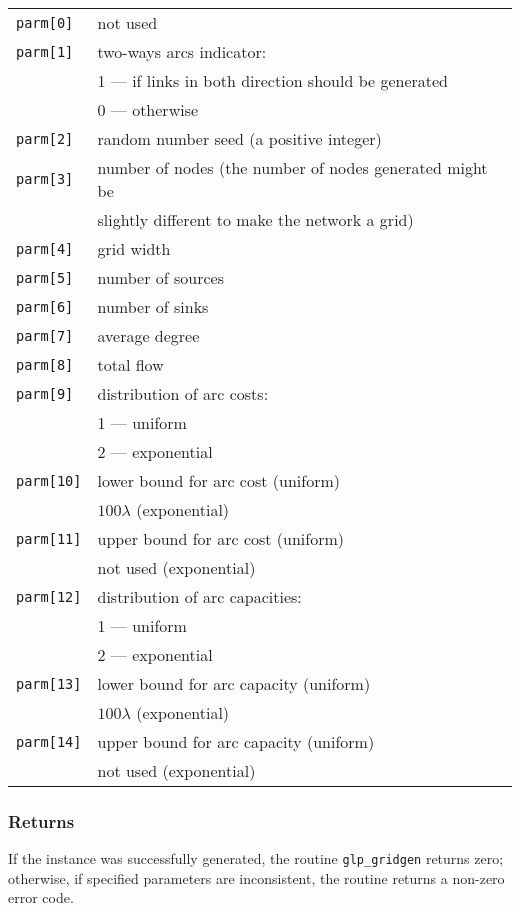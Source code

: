 \begin{tabular}{@{}ll@{}}
\verb|parm[0] |&not used\\
\verb|parm[1] |&two-ways arcs indicator:\\
               &1 --- if links in both direction should be generated\\
               &0 --- otherwise\\
\verb|parm[2] |&random number seed (a positive integer)\\
\verb|parm[3] |&number of nodes (the number of nodes generated might
be\\&slightly different to make the network a grid)\\
\verb|parm[4] |&grid width\\
\verb|parm[5] |&number of sources\\
\verb|parm[6] |&number of sinks\\
\verb|parm[7] |&average degree\\
\verb|parm[8] |&total flow\\
\verb|parm[9] |&distribution of arc costs:\\
               &1 --- uniform\\
               &2 --- exponential\\
\verb|parm[10]|&lower bound for arc cost (uniform)\\
               &$100\lambda$ (exponential)\\
\verb|parm[11]|&upper bound for arc cost (uniform)\\
               &not used (exponential)\\
\verb|parm[12]|&distribution of arc capacities:\\
               &1 --- uniform\\
               &2 --- exponential\\
\verb|parm[13]|&lower bound for arc capacity (uniform)\\
               &$100\lambda$ (exponential)\\
\verb|parm[14]|&upper bound for arc capacity (uniform)\\
               &not used (exponential)\\
\end{tabular}

\subsubsection*{Returns}

If the instance was successfully generated, the routine
\verb|glp_gridgen| returns zero; otherwise, if specified parameters are
inconsistent, the routine returns a non-zero error code.

